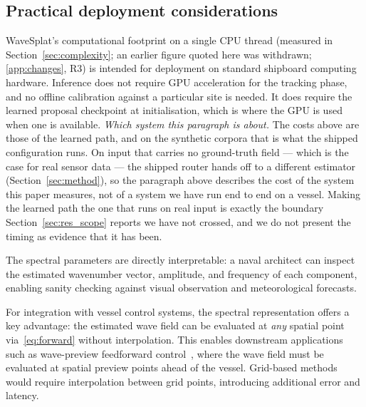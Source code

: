 \documentclass[review]{elsarticle}
\begin{document}
\subsection{Practical deployment considerations}

WaveSplat's computational footprint on a single CPU thread
(measured in Section~\ref{sec:complexity}; an earlier figure quoted here was
withdrawn; \ref{app:changes}, R3) is intended for
deployment on standard shipboard computing hardware.  Inference does not require GPU acceleration for the tracking phase, and no offline calibration against a particular site is needed. It does require the learned proposal checkpoint at initialisation, which is where the GPU is used when one is available.
\emph{Which system this paragraph is about.} The costs above are those of the
learned path, and on the synthetic corpora that is what the shipped configuration
runs. On input that carries no ground-truth field --- which is the case for real
sensor data --- the shipped router hands off to a different estimator
(Section~\ref{sec:method}), so the paragraph above describes the cost of the system
this paper measures, not of a system we have run end to end on a vessel. Making the
learned path the one that runs on real input is exactly the boundary
Section~\ref{sec:res_scope} reports we have not crossed, and we do not present the
timing as evidence that it has been.

The spectral parameters are directly interpretable: a naval architect
can inspect the estimated wavenumber vector, amplitude, and frequency
of each component, enabling sanity checking against visual observation
and meteorological forecasts.

For integration with vessel control systems, the spectral representation
offers a key advantage: the estimated wave field can be evaluated at
\emph{any} spatial point via~\eqref{eq:forward} without interpolation.
This enables downstream applications such as wave-preview feedforward
control~\citep{park2026hydrofoil}, where the wave field must be
evaluated at spatial preview points ahead of the vessel.
Grid-based methods would require interpolation between grid points,
introducing additional error and latency.
\end{document}
